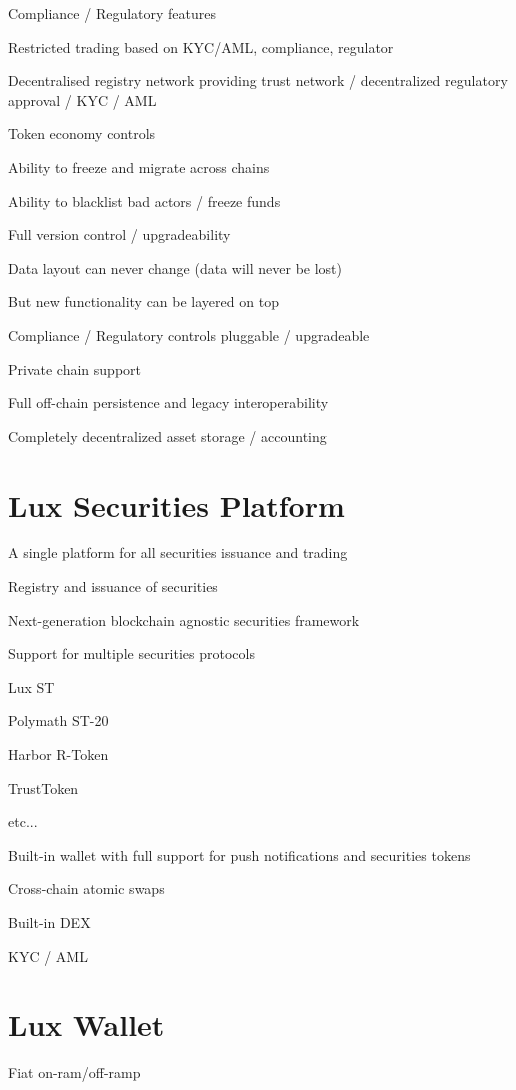 \documentclass[11pt]{article}
\begin{document}
Compliance / Regulatory features


Restricted trading based on KYC/AML, compliance, regulator


Decentralised registry network providing trust network / decentralized regulatory approval / KYC / AML


Token economy controls


Ability to freeze and migrate across chains


Ability to blacklist bad actors / freeze funds


Full version control / upgradeability


Data layout can never change (data will never be lost)


But new functionality can be layered on top


Compliance / Regulatory controls pluggable / upgradeable


Private chain support


Full off-chain persistence and legacy interoperability


Completely decentralized asset storage / accounting


\section{Lux Securities Platform}

A single platform for all securities issuance and trading


Registry and issuance of securities


Next-generation blockchain agnostic securities framework


Support for multiple securities protocols


Lux ST


Polymath ST-20


Harbor R-Token


TrustToken


etc...


Built-in wallet with full support for push notifications and securities tokens


Cross-chain atomic swaps


Built-in DEX


KYC / AML


\section{Lux Wallet}

Fiat on-ram/off-ramp
\end{document}
